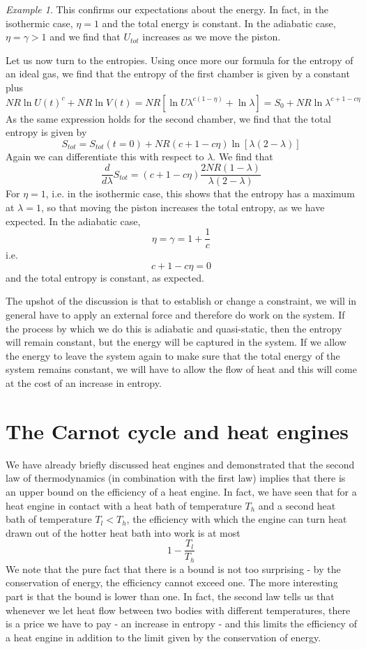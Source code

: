 \documentclass[a4paper, draft]{article}
\theoremstyle{own}
\theoremstyle{remark}
\newtheorem{example}{Example}[section]
\begin{document}
\begin{example}
This confirms our expectations about the energy. In fact, in the isothermic case, $\eta = 1$ and the total energy is constant. In the adiabatic case, $\eta = \gamma > 1$ and we find that $U_{tot}$ increases as we move the piston. 

Let us now turn to the entropies. Using once more our formula for the entropy of an ideal gas, we find that the entropy of the first chamber is given by a constant plus
$$
N R \ln U(t)^c + NR \ln V(t)   = NR [ \ln U \lambda^{c(1 - \eta)} + \ln \lambda] = S_0 + NR \ln \lambda^{c + 1 - c\eta}
$$
As the same expression holds for the second chamber, we find that the total entropy is given by
$$
S_{tot} = S_{tot}(t = 0) + NR (c + 1 - c\eta)\ln [ \lambda (2 - \lambda) ]
$$
Again we can differentiate this with respect to $\lambda$. We find that
$$
\frac{d}{d\lambda} S_{tot} = ( c + 1 - c\eta ) \frac{2 NR(1 -  \lambda)}{\lambda (2 - \lambda)} 
$$
For $\eta = 1$, i.e. in the isothermic case, this shows that the entropy has a maximum at $\lambda = 1$, so that moving the piston increases the total entropy, as we have expected. In the adiabatic case, 
$$
\eta = \gamma = 1 + \frac{1}{c}
$$
i.e.
$$
c + 1 - c \eta = 0
$$
and the total entropy is constant, as expected.

The upshot of the discussion is that to establish or change a constraint, we will in general have to apply an external force and therefore do work on the system. If the process by which we do this is adiabatic and quasi-static, then the entropy will remain constant, but the energy will be captured in the system. If we allow the energy to leave the system again to make sure that the total energy of the system remains constant, we will have to allow the flow of heat and this will come at the cost of an increase in entropy.

\end{example}

\section{The Carnot cycle and heat engines}

We have already briefly discussed heat engines and demonstrated that the second law of thermodynamics (in combination with the first law) implies that there is an upper bound on the efficiency of a heat engine. In fact, we have seen that for a heat engine in contact with a heat bath of temperature $T_h$ and a second heat bath of temperature $T_l < T_h$, the efficiency with which the engine can turn heat drawn out of the hotter heat bath into work is at most
$$
1 - \frac{T_l}{T_h}
$$
We note that the pure fact that there is a bound is not too surprising - by the conservation of energy, the efficiency cannot exceed one. The more interesting part is that the bound is lower than one. In fact, the second law tells us that whenever we let heat flow between two bodies with different temperatures, there is a price we have to pay - an increase in entropy - and this limits the efficiency of a heat engine in addition to the limit given by the conservation of energy.
\end{document}
